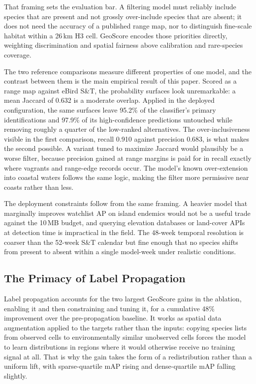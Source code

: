 That framing sets the evaluation bar. A filtering model must reliably include species that are present and not grossly over-include species that are absent; it does not need the accuracy of a published range map, nor to distinguish fine-scale habitat within a 26\,km H3 cell. GeoScore encodes those priorities directly, weighting discrimination and spatial fairness above calibration and rare-species coverage.

The two reference comparisons measure different properties of one model, and the contrast between them is the main empirical result of this paper. Scored as a range map against eBird S\&T, the probability surfaces look unremarkable: a mean Jaccard of 0.632 is a moderate overlap. Applied in the deployed configuration, the same surfaces leave 95.2\% of the classifier's primary identifications and 97.9\% of its high-confidence predictions untouched while removing roughly a quarter of the low-ranked alternatives. The over-inclusiveness visible in the first comparison, recall 0.910 against precision 0.683, is what makes the second possible. A variant tuned to maximize Jaccard would plausibly be a worse filter, because precision gained at range margins is paid for in recall exactly where vagrants and range-edge records occur. The model's known over-extension into coastal waters follows the same logic, making the filter more permissive near coasts rather than less.

The deployment constraints follow from the same framing. A heavier model that marginally improves watchlist AP on island endemics would not be a useful trade against the 10\,MB budget, and querying elevation databases or land-cover APIs at detection time is impractical in the field. The 48-week temporal resolution is coarser than the 52-week S\&T calendar but fine enough that no species shifts from present to absent within a single model-week under realistic conditions.

\subsection{The Primacy of Label Propagation}
\label{sec:disc-propagation}

Label propagation accounts for the two largest GeoScore gains in the ablation, enabling it and then constraining and tuning it, for a cumulative 48\% improvement over the pre-propagation baseline. It works as spatial data augmentation applied to the targets rather than the inputs: copying species lists from observed cells to environmentally similar unobserved cells forces the model to learn distributions in regions where it would otherwise receive no training signal at all. That is why the gain takes the form of a redistribution rather than a uniform lift, with sparse-quartile mAP rising and dense-quartile mAP falling slightly.

